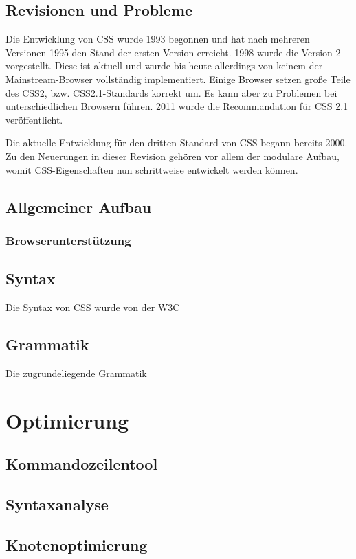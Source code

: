 \documentclass[11pt]{scrartcl}
\begin{document}
\subsection{Revisionen und Probleme}
Die Entwicklung von CSS wurde 1993 begonnen und hat nach mehreren Versionen 1995 den Stand der ersten Version erreicht. 1998 wurde die Version 2 vorgestellt. Diese ist aktuell und wurde bis heute allerdings von keinem der Mainstream-Browser vollständig implementiert. Einige Browser setzen große Teile des CSS2, bzw. CSS2.1-Standards korrekt um. Es kann aber zu Problemen bei unterschiedlichen Browsern führen. 2011 wurde die Recommandation für CSS 2.1 veröffentlicht. 

Die aktuelle Entwicklung für den dritten Standard von CSS begann bereits 2000. Zu den Neuerungen in dieser Revision gehören vor allem der modulare Aufbau, womit CSS-Eigenschaften nun schrittweise entwickelt werden können. 

\subsection{Allgemeiner Aufbau}

\subsubsection{Browserunterstützung}
\subsection{Syntax}
Die Syntax von CSS wurde von der W3C 
\subsection{Grammatik}
Die zugrundeliegende Grammatik 
\pagebreak
\section{Optimierung}
\subsection{Kommandozeilentool}
\subsection{Syntaxanalyse}
\subsection{Knotenoptimierung}
\subsubsection{}
\end{document}
